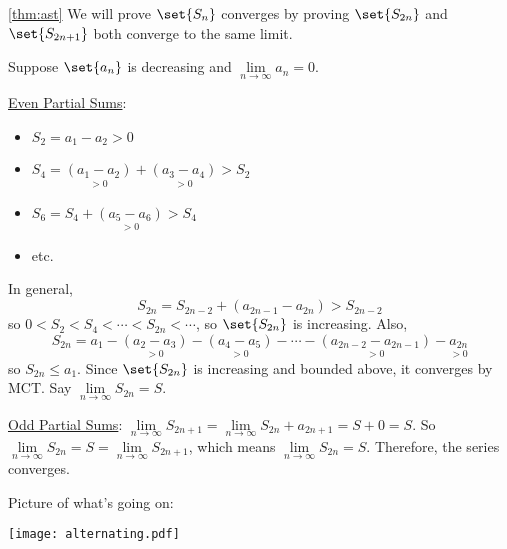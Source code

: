 \begin{Proof}{\ref{thm:ast}}{}
    We will prove $ \set{S_n} $ converges by proving $ \set{S_{2n}} $
    and $ \set{S_{2n+1}} $ both converge to the same limit.

    Suppose
    $ \set{a_n} $ is decreasing and $ \lim\limits_{{n} \to {\infty}} a_n=0 $.

    \underline{Even Partial Sums}:
    \begin{itemize}
        \item $ S_2=a_1-a_2>0 $
        \item $ S_4=\underset{>0}{(a_1-a_2)}+\underset{>0}{(a_3-a_4)}>S_2 $
        \item $ S_6=S_4+\underset{>0}{(a_5-a_6)}>S_4 $
        \item etc.
    \end{itemize}
    In general,
    \[ S_{2n}=S_{2n-2}+\left( a_{2n-1}-a_{2n} \right)>S_{2n-2} \]
    so $ 0<S_2<S_4<\cdots<S_{2n}<\cdots $, so $ \set{S_{2n}} $ is increasing.
    Also,
    \[ S_{2n}=a_1-\underset{>0}{(a_2-a_3)}-\underset{>0}{(a_4-a_5)}-\cdots-
        \underset{>0}{(a_{2n-2}-a_{2n-1})}- \underset{>0}{a_{2n}} \]
    so $ S_{2n}\leqslant a_1 $. Since $ \set{S_{2n}} $ is increasing and bounded above,
    it converges by MCT\@. Say $ \lim\limits_{{n} \to {\infty}} S_{2n}=S $.

    \underline{Odd Partial Sums}: $ \lim\limits_{{n} \to {\infty}} S_{2n+1}=
        \lim\limits_{{n} \to {\infty}} S_{2n}+a_{2n+1}=S+0=S $. So
    $ \lim\limits_{{n} \to {\infty}} S_{2n}=S=\lim\limits_{{n} \to {\infty}} S_{2n+1} $,
    which means $ \lim\limits_{{n} \to {\infty}} S_{2n}=S $. Therefore, the series converges.
\end{Proof}

Picture of what's going on:
\begin{center}
    \texttt{[image: alternating.pdf]}
\end{center}

